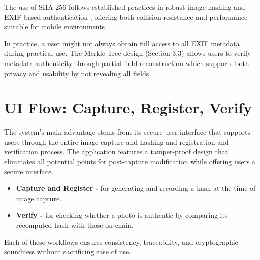 The use of SHA-256 follows established practices in robust image hashing \cite{robustImageHashing} and EXIF-based authentication \cite{authenticationOfDigitalImageExifMetadata}, offering both collision resistance and performance suitable for mobile environments.


In practice, a user might not always obtain full access to all EXIF metadata during practical use. The Merkle Tree design (Section 3.3) allows users to verify metadata authenticity through partial field reconstruction which supports both privacy and usability by not revealing all fields.

\section{UI Flow: Capture, Register, Verify}
The system's main advantage stems from its secure user interface that supports users through the entire image capture and hashing and registration and verification process. The application features a tamper-proof design that eliminates all potential points for post-capture modification while offering users a secure interface.

\begin{itemize}
    \item {\textbf{Capture and Register -}} for generating and recording a hash at the time of image capture.
    \item {\textbf{Verify -}} for checking whether a photo is authentic by comparing its recomputed hash with those on-chain.
\end{itemize}

Each of these workflows ensures consistency, traceability, and cryptographic soundness without sacrificing ease of use.

